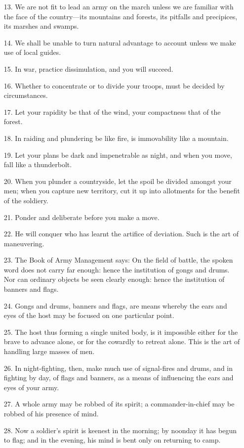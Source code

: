\documentclass[11pt,openany]{memoir}
\newcommand{\enumeratemargin}{1.30em}
\begin{document}
\begin{enumerate}[leftmargin=\enumeratemargin]
\item[13.] We are not fit to lead an army on the march unless we are familiar with the face of the country---its mountains and forests, its pitfalls and precipices, its marshes and swamps.
\item[14.] We shall be unable to turn natural advantage to account unless we make use of local guides.
\item[15.] In war, practice dissimulation, and you will succeed.
\item[16.] Whether to concentrate or to divide your troops, must be decided by circumstances.
\item[17.] Let your rapidity be that of the wind, your compactness that of the forest.
\item[18.] In raiding and plundering be like fire, is immovability like a mountain.
\item[19.] Let your plans be dark and impenetrable as night, and when you move, fall like a thunderbolt.
\item[20.] When you plunder a countryside, let the spoil be divided amongst your men; when you capture new territory, cut it up into allotments for the benefit of the soldiery.
\item[21.] Ponder and deliberate before you make a move.
\item[22.] He will conquer who has learnt the artifice of deviation. Such is the art of maneuvering.
\item[23.] The Book of Army Management says: On the field of battle, the spoken word does not carry far enough: hence the institution of gongs and drums. Nor can ordinary objects be seen clearly enough: hence the institution of banners and flags.
\item[24.] Gongs and drums, banners and flags, are means whereby the ears and eyes of the host may be focused on one particular point.
\item[25.] The host thus forming a single united body, is it impossible either for the brave to advance alone, or for the cowardly to retreat alone. This is the art of handling large masses of men.
\item[26.] In night-fighting, then, make much use of signal-fires and drums, and in fighting by day, of flags and banners, as a means of influencing the ears and eyes of your army.
\item[27.] A whole army may be robbed of its spirit; a commander-in-chief may be robbed of his presence of mind.
\item[28.] Now a soldier's spirit is keenest in the morning; by noonday it has begun to flag; and in the evening, his mind is bent only on returning to camp.

\end{enumerate}
\end{document}
